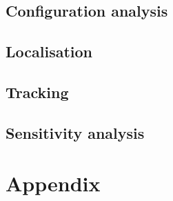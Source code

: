 \documentclass[10pt,a4paper]{report}
\begin{document}
\section{Configuration analysis}
\label{Configuration analysis}


\newpage
\section{Localisation}
\label{Localisationg}

\newpage
\section{Tracking}
\label{Tracking}

\newpage
\section{Sensitivity analysis}
\label{Sensitivity analysis}

\chapter{Appendix}
\end{document}
